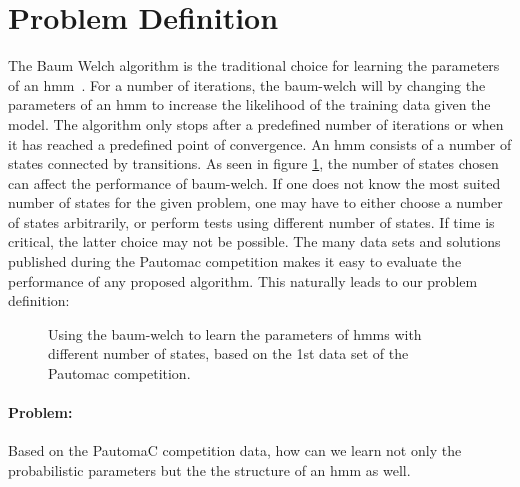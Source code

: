 \section{Problem Definition}

The Baum Welch algorithm is the traditional choice for learning the parameters of an \gls{hmm}~\cite{pautomacTR}. 
For a number of iterations, the \gls{baum-welch} will by changing the parameters of an \gls{hmm} to increase the likelihood of the training data given the model. The algorithm only stops after a predefined number of iterations or when it has reached a predefined point of convergence.
An \gls{hmm} consists of a number of states connected by transitions. As seen in figure \ref{fig:bw-states-are-important}, the number of states chosen can affect the performance of \gls{baum-welch}. If one does not know the most suited number of states for the given problem, one may have to either choose a number of states arbitrarily, or perform tests using different number of states. If time is critical, the latter choice may not be possible.
The many data sets and solutions published during the Pautomac competition makes it easy to evaluate the performance of any proposed algorithm.
This naturally leads to our problem definition:

\begin{figure}
\begin{centering}
\caption{Using the \gls{baum-welch} to learn the parameters of \gls{hmm}s with different number of states, based on the 1st data set of the Pautomac competition.}
\label{fig:bw-states-are-important} 
\end{centering}
\end{figure}


\paragraph{Problem:}
Based on the PautomaC competition data, how can we learn not only the probabilistic parameters but the the structure of an \gls{hmm} as well.